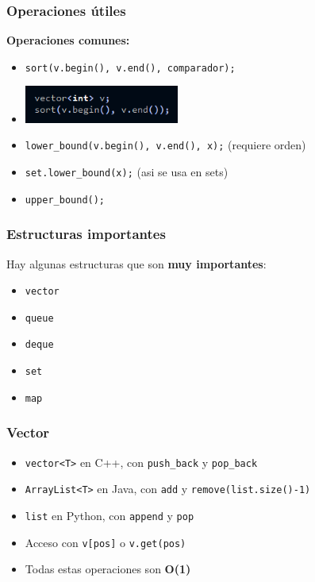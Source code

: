 \documentclass{beamer}
\begin{document}
\begin{frame}
  \frametitle{Operaciones útiles}

  \textbf{Operaciones comunes:}
  \begin{itemize}
    \item \texttt{sort(v.begin(), v.end(), comparador);}
    \item 
    \includegraphics[width=0.4\textwidth]{fotos/sort.png}
    \item \texttt{lower\_bound(v.begin(), v.end(), x);} (requiere orden)
    \item \texttt{set.lower\_bound(x);} (asi se usa en sets)
    \item \texttt{upper\_bound();}
  \end{itemize}
\end{frame}


\begin{frame}
  
  \frametitle{Estructuras importantes}
  Hay algunas estructuras que son \textbf{muy importantes}:
  \begin{itemize}
    \item \texttt{vector}
    \item \texttt{queue}
    \item \texttt{deque}
    \item \texttt{set}
    \item \texttt{map}
  \end{itemize}
\end{frame}



\begin{frame}
  \frametitle{Vector}
  \begin{itemize}
    \item \texttt{vector<T>} en C++, con \texttt{push\_back} y \texttt{pop\_back}
    \item \texttt{ArrayList<T>} en Java, con \texttt{add} y \texttt{remove(list.size()-1)}
    \item \texttt{list} en Python, con \texttt{append} y \texttt{pop}
    \item Acceso con \texttt{v[pos]} o \texttt{v.get(pos)}
    \item Todas estas operaciones son \textbf{O(1)}
  \end{itemize}
\end{frame}
\end{document}
